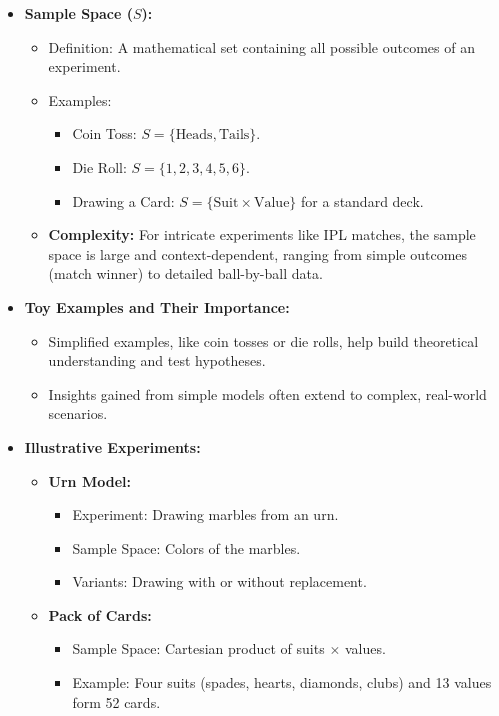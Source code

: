 \documentclass{article}
\begin{document}
\begin{itemize}
  \item \textbf{Sample Space ($S$):}
    \begin{itemize}
      \item Definition: A mathematical set containing all possible outcomes of an experiment.
      \item Examples:
        \begin{itemize}
          \item Coin Toss: $S = \{\text{Heads}, \text{Tails}\}$.
          \item Die Roll: $S = \{1, 2, 3, 4, 5, 6\}$.
          \item Drawing a Card: $S = \{\text{Suit} \times \text{Value}\}$ for a standard deck.
        \end{itemize}
      \item \textbf{Complexity:} For intricate experiments like IPL matches, the sample space is large and context-dependent, ranging from simple outcomes (match winner) to detailed ball-by-ball data.
    \end{itemize}

  \item \textbf{Toy Examples and Their Importance:}
    \begin{itemize}
      \item Simplified examples, like coin tosses or die rolls, help build theoretical understanding and test hypotheses.
      \item Insights gained from simple models often extend to complex, real-world scenarios.
    \end{itemize}

  \item \textbf{Illustrative Experiments:}
    \begin{itemize}
      \item \textbf{Urn Model:}
        \begin{itemize}
          \item Experiment: Drawing marbles from an urn.
          \item Sample Space: Colors of the marbles.
          \item Variants: Drawing with or without replacement.
        \end{itemize}
      \item \textbf{Pack of Cards:}
        \begin{itemize}
          \item Sample Space: Cartesian product of suits $\times$ values.
          \item Example: Four suits (spades, hearts, diamonds, clubs) and 13 values form 52 cards.
        \end{itemize}
    \end{itemize}


\end{itemize}
\end{document}
